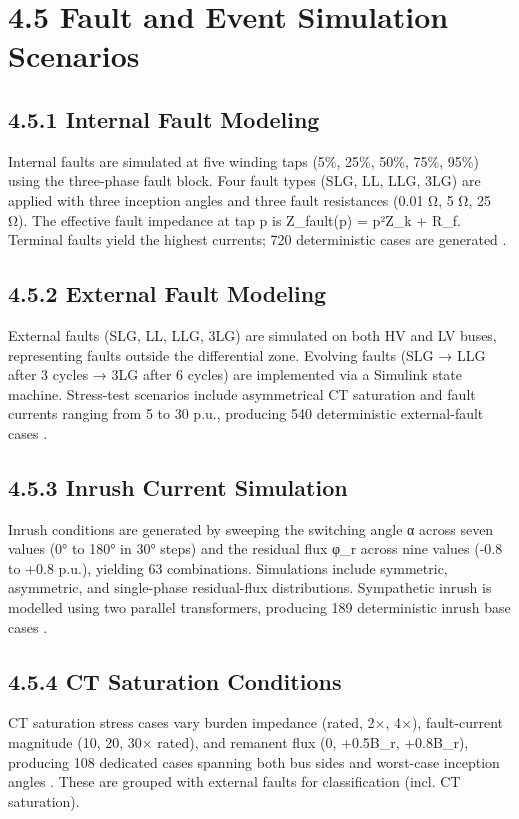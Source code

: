 \section{4.5  Fault and Event Simulation Scenarios}

\subsection{4.5.1  Internal Fault Modeling}
Internal faults are simulated at five winding taps (5\%, 25\%, 50\%, 75\%, 95\%) using the three-phase fault block. Four fault types (SLG, LL, LLG, 3LG) are applied with three inception angles and three fault resistances (0.01 Ω, 5 Ω, 25 Ω). The effective fault impedance at tap p is Z\_fault(p) = p²Z\_k + R\_f. Terminal faults yield the highest currents; 720 deterministic cases are generated \cite{ref11}.


\subsection{4.5.2  External Fault Modeling}
External faults (SLG, LL, LLG, 3LG) are simulated on both HV and LV buses, representing faults outside the differential zone. Evolving faults (SLG → LLG after 3 cycles → 3LG after 6 cycles) are implemented via a Simulink state machine. Stress-test scenarios include asymmetrical CT saturation and fault currents ranging from 5 to 30 p.u., producing 540 deterministic external-fault cases \cite{ref12}.


\subsection{4.5.3  Inrush Current Simulation}
Inrush conditions are generated by sweeping the switching angle α across seven values (0° to 180° in 30° steps) and the residual flux φ\_r across nine values (-0.8 to +0.8 p.u.), yielding 63 combinations. Simulations include symmetric, asymmetric, and single-phase residual-flux distributions. Sympathetic inrush is modelled using two parallel transformers, producing 189 deterministic inrush base cases \cite{ref13}.


\subsection{4.5.4  CT Saturation Conditions}
CT saturation stress cases vary burden impedance (rated, 2×, 4×), fault-current magnitude (10, 20, 30× rated), and remanent flux (0, +0.5B\_r, +0.8B\_r), producing 108 dedicated cases spanning both bus sides and worst-case inception angles \cite{ref14}. These are grouped with external faults for classification (incl. CT saturation).


